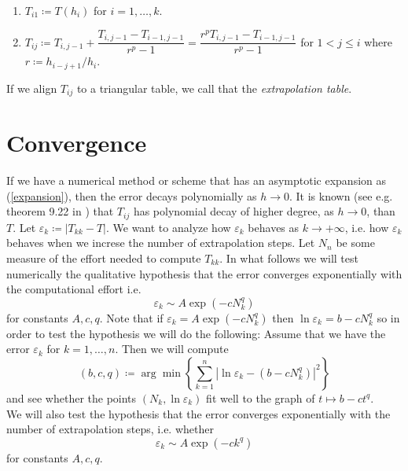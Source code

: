 \begin{enumerate}
    \item \(T_{i1}\coloneqq T(h_i)\) for \(i=1,\ldots,k\).
    \item \(T_{ij}\coloneqq T_{i,j-1} + \dfrac{T_{i,j-1} - T_{i-1,j-1}}{r^p - 1} = \dfrac{r^pT_{i,j-1} - T_{i-1,j-1}}{r^p-1}\) for \(1 < j \leq i\) where \(r\coloneqq h_{i-j+1}/h_i\). 
\end{enumerate}

If we align \(T_{ij}\) to a triangular table, we call that the {\it extrapolation table}.\\

\section{Convergence}

If we have a numerical method or scheme that has an asymptotic expansion as (\ref{expansion}), then the error decays polynomially as \(h\rightarrow 0\). It is known (see e.g. theorem 9.22 in \cite{dh}) that \(T_{ij}\) has  polynomial decay of higher degree, as \(h\rightarrow 0\), than \(T\). Let \(\varepsilon_k \coloneqq |T_{kk} - T|\). We want to analyze how \(\varepsilon_k\) behaves as \(k\rightarrow +\infty\), i.e. how \(\varepsilon_k\) behaves when we increse the number of extrapolation steps. Let \(N_n\) be some measure of the effort needed to compute \(T_{kk}\). In what follows we will test numerically the qualitative hypothesis that the error converges exponentially with the computational effort i.e.
\begin{equation}
\varepsilon_k \sim A \exp(-cN_k^q)
\end{equation}
for constants \(A, c, q\). Note that if \(\varepsilon_k = A\exp(-c N_k^q)\) then \(\ln\varepsilon_k = b - cN_k^q\) so in order to test the hypothesis we will do the following: Assume that we have the error \(\varepsilon_k\) for \(k=1,\ldots,n\). Then we will compute
\begin{equation}
(b,c,q) \coloneqq \arg\min \left\{\sum_{k=1}^n|\ln \varepsilon_k - (b - cN_k^q)|^2\right\}
\end{equation}
and see whether the points \((N_k,\ln\varepsilon_k)\) fit well to the graph of \(t\mapsto b - ct^q\).\\

We will also test the hypothesis that the error converges exponentially with the number of extrapolation steps, i.e. whether
\begin{equation}
\varepsilon_k \sim A \exp(-ck^q)
\end{equation}
for constants \(A,c,q\).\\

